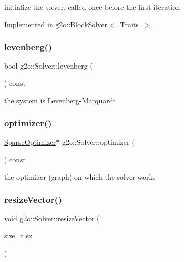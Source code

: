initialize the solver, called once before the first iteration 

Implemented in \mbox{\hyperlink{classg2o_1_1_block_solver_a8bf01018abc3bfddfa3b29a380a1d6cb}{g2o\+::\+Block\+Solver$<$ Traits $>$}}.

\mbox{\label{classg2o_1_1_solver_ab472c69fa089382242a75be76e8f883e}} 
\subsubsection{\texorpdfstring{levenberg()}{levenberg()}}
{\footnotesize\ttfamily bool g2o\+::\+Solver\+::levenberg (\begin{DoxyParamCaption}{ }\end{DoxyParamCaption}) const\hspace{0.3cm}{\ttfamily [inline]}}



the system is Levenberg-\/\+Marquardt 

\mbox{\label{classg2o_1_1_solver_a266bc31d289e824de6166522579ed385}} 
\subsubsection{\texorpdfstring{optimizer()}{optimizer()}}
{\footnotesize\ttfamily \mbox{\hyperlink{classg2o_1_1_sparse_optimizer}{Sparse\+Optimizer}}$\ast$ g2o\+::\+Solver\+::optimizer (\begin{DoxyParamCaption}{ }\end{DoxyParamCaption}) const\hspace{0.3cm}{\ttfamily [inline]}}



the optimizer (graph) on which the solver works 

\mbox{\label{classg2o_1_1_solver_ad1f85839e85f3e2c49112fb7e2b843ad}} 
\subsubsection{\texorpdfstring{resize\+Vector()}{resizeVector()}}
{\footnotesize\ttfamily void g2o\+::\+Solver\+::resize\+Vector (\begin{DoxyParamCaption}\item[{size\+\_\+t}]{sx }\end{DoxyParamCaption})\hspace{0.3cm}{\ttfamily [protected]}}

